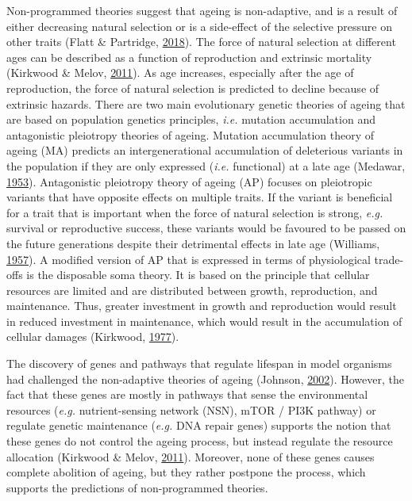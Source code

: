 \documentclass[12pt,twoside]{unicam}
\begin{document}
Non-programmed theories suggest that ageing is non-adaptive, and is a result of either decreasing natural selection or is a side-effect of the selective pressure on other traits (Flatt \& Partridge, \protect\hyperlink{ref-Flatt2018}{2018}). The force of natural selection at different ages can be described as a function of reproduction and extrinsic mortality (Kirkwood \& Melov, \protect\hyperlink{ref-Kirkwood2011}{2011}). As age increases, especially after the age of reproduction, the force of natural selection is predicted to decline because of extrinsic hazards. There are two main evolutionary genetic theories of ageing that are based on population genetics principles, \emph{i.e.} mutation accumulation and antagonistic pleiotropy theories of ageing. Mutation accumulation theory of ageing (MA) predicts an intergenerational accumulation of deleterious variants in the population if they are only expressed (\emph{i.e.} functional) at a late age (Medawar, \protect\hyperlink{ref-Medawar1953}{1953}). Antagonistic pleiotropy theory of ageing (AP) focuses on pleiotropic variants that have opposite effects on multiple traits. If the variant is beneficial for a trait that is important when the force of natural selection is strong, \emph{e.g.} survival or reproductive success, these variants would be favoured to be passed on the future generations despite their detrimental effects in late age (Williams, \protect\hyperlink{ref-Williams1957}{1957}). A modified version of AP that is expressed in terms of physiological trade-offs is the disposable soma theory. It is based on the principle that cellular resources are limited and are distributed between growth, reproduction, and maintenance. Thus, greater investment in growth and reproduction would result in reduced investment in maintenance, which would result in the accumulation of cellular damages (Kirkwood, \protect\hyperlink{ref-Kirkwood1977}{1977}).

The discovery of genes and pathways that regulate lifespan in model organisms had challenged the non-adaptive theories of ageing (Johnson, \protect\hyperlink{ref-Johnson2002}{2002}). However, the fact that these genes are mostly in pathways that sense the environmental resources (\emph{e.g.} nutrient-sensing network (NSN), mTOR / PI3K pathway) or regulate genetic maintenance (\emph{e.g.} DNA repair genes) supports the notion that these genes do not control the ageing process, but instead regulate the resource allocation (Kirkwood \& Melov, \protect\hyperlink{ref-Kirkwood2011}{2011}). Moreover, none of these genes causes complete abolition of ageing, but they rather postpone the process, which supports the predictions of non-programmed theories.
\end{document}
